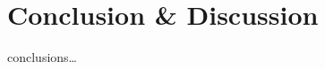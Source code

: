 \documentclass[runningheads]{llncs}
\begin{document}


\section{Conclusion \& Discussion}
conclusions\dots
%
%
%


\end{document}
